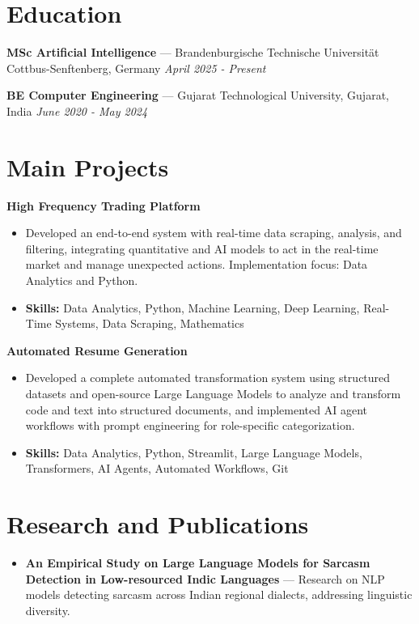 \documentclass[a4paper,10pt]{article}
\begin{document}
\section*{Education}
\textbf{MSc Artificial Intelligence} — Brandenburgische Technische Universität Cottbus-Senftenberg, Germany \hfill \textit{April 2025 - Present}\par
\vspace{1.5pt}
\textbf{BE Computer Engineering} — Gujarat Technological University, Gujarat, India \hfill \textit{June 2020 - May 2024}\par

\section*{Main Projects}
\textbf{High Frequency Trading Platform}\par
\vspace{1pt}
\begin{itemize}
  \item Developed an end-to-end system with real-time data scraping, analysis, and filtering, integrating quantitative and AI models to act in the real-time market and manage unexpected actions. Implementation focus: Data Analytics and Python.
  \item \textbf{Skills:} Data Analytics, Python, Machine Learning, Deep Learning, Real-Time Systems, Data Scraping, Mathematics
\end{itemize}
\vspace{3pt}
\textbf{Automated Resume Generation}\par
\vspace{1pt}
\begin{itemize}
  \item Developed a complete automated transformation system using structured datasets and open-source Large Language Models to analyze and transform code and text into structured documents, and implemented AI agent workflows with prompt engineering for role-specific categorization.
  \item \textbf{Skills:} Data Analytics, Python, Streamlit, Large Language Models, Transformers, AI Agents, Automated Workflows, Git
\end{itemize}

\section*{Research and Publications}
\begin{itemize}
\item \textbf{An Empirical Study on Large Language Models for Sarcasm Detection in Low-resourced Indic Languages} — Research on NLP models detecting sarcasm across Indian regional dialects, addressing linguistic diversity.
\end{itemize}
\end{document}
